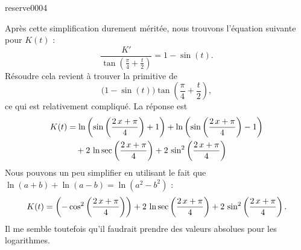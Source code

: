 \begin{corrige}{reserve0004}
\begin{enumerate}
Après cette simplification durement méritée, nous trouvons l'équation suivante pour $K(t)$ :
\begin{equation}		\label{EqFracII107exoVVprb}
	\frac{ K' }{ \tan\left( \frac{ \pi }{ 4 }+\frac{ t }{ 2 } \right) }=1-\sin(t).
\end{equation}
Résoudre cela revient à trouver la primitive de
\begin{equation}
\big( 1-\sin(t) \big) \tan\left( \frac{ \pi }{ 4 }+\frac{ t }{ 2 } \right),
\end{equation}
ce qui est relativement compliqué. La réponse est
\begin{equation}
	\begin{aligned}[]
		K(t)	&=\ln \left(\sin \left({{2\,x+\pi}\over{4}}\right)+1\right)+\ln  \left(\sin \left({{2\,x+\pi}\over{4}}\right)-1\right)\\
			&\quad+2\,\ln \sec  \left({{2\,x+\pi}\over{4}}\right)+2\,\sin ^2\left({{2\,x+\pi}\over{4 }}\right)
	\end{aligned}
\end{equation}
Nous pouvons un peu simplifier en utilisant le fait que $\ln(a+b)+\ln(a-b)=\ln(a^2-b^2)$ :
\begin{equation}
	\begin{aligned}[]
		K(t)	=\left(-\cos^2 \left({{2\,x+\pi}\over{4}}\right)\right)
			+2\,\ln \sec  \left({{2\,x+\pi}\over{4}}\right)+2\,\sin ^2\left({{2\,x+\pi}\over{4 }}\right).
	\end{aligned}
\end{equation}
Il me semble toutefois qu'il faudrait prendre des valeurs absolues pour les logarithmes.

\end{enumerate}

\end{corrige}
